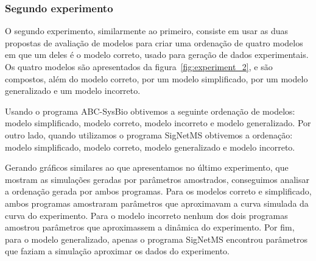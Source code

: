 \documentclass[12pt]{article}
\begin{document}
\subsubsection{Segundo experimento}
O segundo experimento, similarmente ao primeiro, consiste em usar as
duas propostas de avaliação de modelos para criar uma ordenação de
quatro modelos em que um deles é o modelo correto, usado para geração de
dados experimentais. Os quatro modelos são apresentados da
figura~\ref{fig:experiment_2}, e são compostos, além do modelo correto,
por um modelo simplificado, por um modelo generalizado e um modelo
incorreto. 

Usando o programa ABC-SysBio obtivemos a seguinte ordenação de modelos:
modelo simplificado, modelo correto, modelo incorreto e modelo
generalizado. Por outro lado, quando utilizamos o programa SigNetMS
obtivemos a ordenação: modelo simplificado, modelo correto, modelo
generalizado e modelo incorreto.

Gerando gráficos similares ao que apresentamos no último experimento,
que mostram as simulações geradas por parâmetros amostrados, conseguimos
analisar a ordenação gerada por ambos programas. Para os modelos correto
e simplificado, ambos programas amostraram parâmetros que aproximavam a
curva simulada da curva do experimento. Para o modelo incorreto nenhum
dos dois programas amostrou parâmetros que aproximassem a dinâmica do
experimento. Por fim, para o modelo generalizado, apenas o programa
SigNetMS encontrou parâmetros que faziam a simulação aproximar os dados
do experimento.
\end{document}
